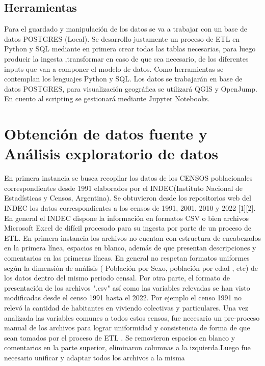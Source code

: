 \documentclass{article}
\theoremstyle{mytheoremstyle}
\theoremstyle{mytheoremstyle}
\theoremstyle{myproblemstyle}
\begin{document}
 
\subsection{Herramientas }
Para el guardado y manipulación de los datos se va a trabajar con un base de datos POSTGRES (Local). 
Se desarrollo justamente un proceso de ETL en Python y SQL mediante en primera crear todas las tablas necesarias, 
para luego producir la ingesta ,transformar en caso de que sea necesario, de los diferentes inputs que van a componer el modelo de datos.	
Como herramientas se contemplan los lenguajes Python y SQL. Los datos se trabajarán en base de datos POSTGRES,
 para visualización geográfica se utilizará QGIS y OpenJump. En cuento al scripting se gestionará mediante Jupyter Notebooks.


\section{Obtención de datos fuente y Análisis exploratorio de datos }
 En primera instancia se busca recopilar los datos de los CENSOS poblacionales 
 correspondientes desde 1991 elaborados por el INDEC(Instituto Nacional de Estadísticas y Censos, Argentina). 
  Se obtuvieron desde los repositorios web del INDEC los datos correspondientes a los censos de  1991, 2001, 2010 y 2022 [1][2].
   En general el INDEC dispone la información en formatos CSV o 
 bien archivos Microsoft Excel  de difícil procesado para su ingesta por parte de un  proceso de ETL. \newline
  En primera instancia los archivos no cuentan con estructura de encabezados en la primera línea, espacios en blanco, además de que 
  presentan descripciones y comentarios en las primeras líneas. En general no respetan formatos uniformes según
  la dimensión de análisis ( Población por Sexo, población por edad , etc) de los datos dentro del mismo periodo censal.
  Por otra parte, el formato de presentación de los  archivos ".csv" así como  las variables relevadas se han 
  visto modificadas desde el censo 1991 hasta el 2022. Por ejemplo el censo 1991 no relevó la cantidad de habitantes
  en viviendo colectivas y particulares.\newline
Una vez analizada las variables comunes a todos estos censos, fue necesario un pre-proceso manual
 de los archivos para lograr uniformidad y consistencia de forma de que sean tomados por el proceso de ETL . Se removieron espacios en blanco y comentarios
en la parte superior, eliminaron columnas a la izquierda.Luego fue necesario unificar y adaptar todos los archivos a la misma
\end{document}
